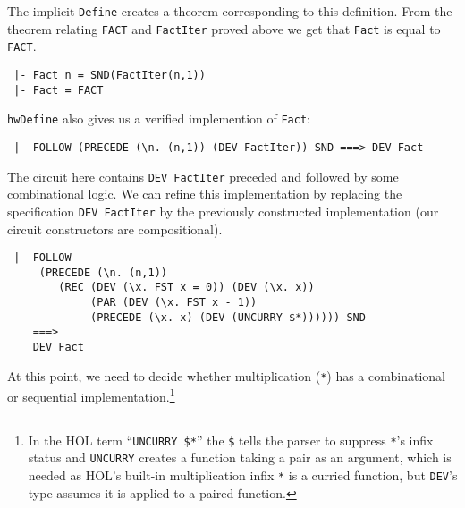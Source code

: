\vspace*{-2mm}

\noindent The implicit \texttt{Define} creates a
theorem corresponding to this definition. From the
theorem relating \texttt{FACT} and \texttt{FactIter} proved above
we get that \texttt{Fact} is equal to \texttt{FACT}.

\vspace*{-2mm}

{\baselineskip10pt\begin{verbatim}
 |- Fact n = SND(FactIter(n,1))
 |- Fact = FACT
\end{verbatim}}

\vspace*{-2mm}

\noindent \texttt{hwDefine} also gives us a verified implemention of
\texttt{Fact}:

\vspace*{-2mm}

{\baselineskip10pt\begin{verbatim}
 |- FOLLOW (PRECEDE (\n. (n,1)) (DEV FactIter)) SND ===> DEV Fact
\end{verbatim}}

\vspace*{-2mm}

\noindent The circuit here contains \texttt{DEV~FactIter} preceded and
followed by some combinational logic. We can refine this
implementation by replacing the specification
\texttt{DEV~FactIter} by the previously constructed implementation
(our circuit constructors are compositional).

\vspace*{-2mm}

{\baselineskip10pt\begin{verbatim}
 |- FOLLOW
     (PRECEDE (\n. (n,1))
        (REC (DEV (\x. FST x = 0)) (DEV (\x. x))
             (PAR (DEV (\x. FST x - 1))
             (PRECEDE (\x. x) (DEV (UNCURRY $*)))))) SND 
    ===> 
    DEV Fact
\end{verbatim}}

\vspace*{-2mm}

At this point, we need to decide whether multiplication (\texttt{*})
has a combinational or sequential implementation.\footnote{In the HOL term
``\texttt{UNCURRY~\$*}'' the \texttt{\$} tells the parser to
suppress \texttt{*}'s infix status and \texttt{UNCURRY} creates a
function taking a pair as an argument, which is needed as HOL's
built-in multiplication infix \texttt{*} is a curried function,
but \texttt{DEV}'s type assumes it is applied to a paired function.}

